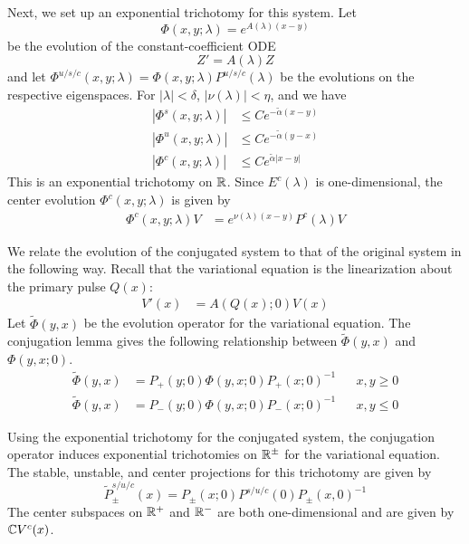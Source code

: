 \documentclass[thesis.tex]{subfiles}
\begin{document}
Next, we set up an exponential trichotomy for this system. Let
\begin{equation}
\Phi(x, y; \lambda) = e^{A(\lambda)(x-y)}
\end{equation}
be the evolution of the constant-coefficient ODE
\[
Z' = A(\lambda) Z
\]
and let $\Phi^{u/s/c}(x, y; \lambda) = \Phi(x, y; \lambda)P^{u/s/c}(\lambda)$ be the evolutions on the respective eigenspaces. For $|\lambda| < \delta$, $|\nu(\lambda)| < \eta$, and we have 
\begin{equation}\label{Zevolbounds}
\begin{aligned}
|\Phi^s(x, y; \lambda)| &\leq C e^{-\tilde{\alpha}(x - y)} \\
|\Phi^u(x, y; \lambda)| &\leq C e^{-\tilde{\alpha}(y - x)} \\
|\Phi^c(x, y; \lambda)| &\leq C e^{\tilde{\alpha}|x - y|} 
\end{aligned}
\end{equation}
This is an exponential trichotomy on $\mathbb{R}$. Since $E^c(\lambda)$ is one-dimensional, the center evolution $\Phi^c(x, y; \lambda)$ is given by
\begin{align}\label{centerevol}
\Phi^c(x, y; \lambda) V &= e^{\nu(\lambda)(x - y)} P^c(\lambda)V
\end{align}

We relate the evolution of the conjugated system to that of the original system in the following way. Recall that the variational equation is the linearization about the primary pulse $Q(x)$:
\begin{align}\label{vareqstab}
V'(x) &= A(Q(x); 0) V(x)
\end{align}
Let $\tilde{\Phi}(y, x)$ be the evolution operator for the variational equation. The conjugation lemma gives the following relationship between $\tilde{\Phi}(y, x)$ and $\Phi(y, x; 0)$.
\begin{align*}
\tilde{\Phi}(y, x) &= P_+(y; 0) \Phi(y, x; 0) P_+(x; 0)^{-1} && x, y \geq 0 \\
\tilde{\Phi}(y, x) &= P_-(y; 0) \Phi(y, x; 0) P_-(x; 0)^{-1} && x, y \leq 0
\end{align*}

Using the exponential trichotomy for the conjugated system, the conjugation operator induces exponential trichotomies on $\mathbb{R}^\pm$ for the variational equation. The stable, unstable, and center projections for this trichotomy are given by
\begin{equation}\label{trichotomyprojunconj}
\tilde{P}^{s/u/c}_\pm(x) = P_\pm(x; 0) P^{s/u/c}(0) P_\pm(x, 0)^{-1}
\end{equation}
The center subspaces on $\mathbb{R}^+$ and $\mathbb{R}^-$ are both one-dimensional and are given by $\mathbb{C} V^c(x)$. 
\end{document}
